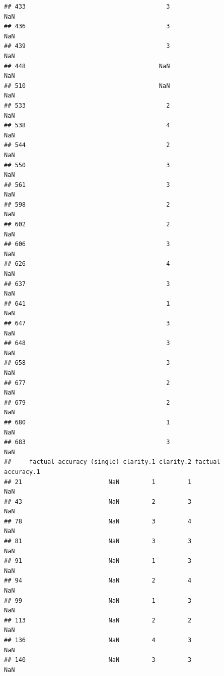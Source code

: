 \documentclass[
]{article}
\begin{document}
\begin{verbatim}
## 433                                       3                             NaN
## 436                                       3                             NaN
## 439                                       3                             NaN
## 448                                     NaN                             NaN
## 510                                     NaN                             NaN
## 533                                       2                             NaN
## 538                                       4                             NaN
## 544                                       2                             NaN
## 550                                       3                             NaN
## 561                                       3                             NaN
## 598                                       2                             NaN
## 602                                       2                             NaN
## 606                                       3                             NaN
## 626                                       4                             NaN
## 637                                       3                             NaN
## 641                                       1                             NaN
## 647                                       3                             NaN
## 648                                       3                             NaN
## 658                                       3                             NaN
## 677                                       2                             NaN
## 679                                       2                             NaN
## 680                                       1                             NaN
## 683                                       3                             NaN
##     factual accuracy (single) clarity.1 clarity.2 factual accuracy.1
## 21                        NaN         1         1                NaN
## 43                        NaN         2         3                NaN
## 78                        NaN         3         4                NaN
## 81                        NaN         3         3                NaN
## 91                        NaN         1         3                NaN
## 94                        NaN         2         4                NaN
## 99                        NaN         1         3                NaN
## 113                       NaN         2         2                NaN
## 136                       NaN         4         3                NaN
## 140                       NaN         3         3                NaN

\end{verbatim}
\end{document}
